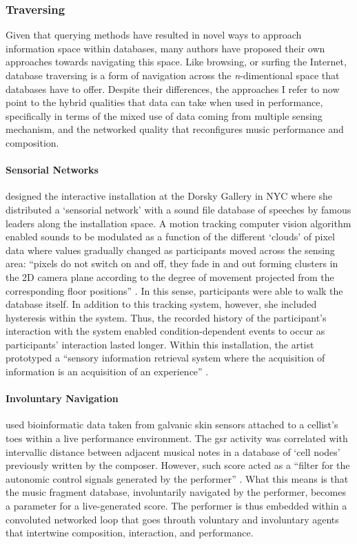 \subsubsection{Traversing}
{
	Given that querying methods have resulted in novel ways to approach information space within databases, many authors have proposed their own approaches towards navigating this space. Like browsing, or surfing the Internet, database traversing is a form of navigation across the \textit{n}-dimentional space that databases have to offer. Despite their differences, the approaches I refer to now point to the hybrid qualities that data can take when used in performance, specifically in terms of the mixed use of data coming from multiple sensing mechanism, and the networked quality that reconfigures music performance and composition.

	\paragraph{Sensorial Networks}
	\citeauthor{icmc/bbp2372.2000.146} \parencite{Cho00:Voi, icmc/bbp2372.2000.146} designed the interactive installation at the Dorsky Gallery in NYC where she distributed a `sensorial network' with a sound file database of speeches by famous leaders along the installation space. A motion tracking computer vision algorithm enabled sounds to be modulated as a function of the different `clouds' of pixel data where values gradually changed as participants moved across the sensing area: ``pixels do not switch on and off, they fade in and out forming clusters in the 2D camera plane according to the degree of movement projected from the corresponding floor positions'' \parencite{icmc/bbp2372.2000.146}. In this sense, participants were able to walk the database itself. In addition to this tracking system, however, she included hysteresis within the system. Thus, the recorded history of the participant's interaction with the system enabled condition-dependent events to occur as participants' interaction lasted longer. Within this installation, the artist prototyped a ``sensory information retrieval system where the acquisition of information is an acquisition of an experience'' \parencite{icmc/bbp2372.2000.146}.

	\paragraph{Involuntary Navigation}
	\citeauthor{icmc/bbp2372.2006.123} \parencite{icmc/bbp2372.2006.123} used bioinformatic data taken from galvanic skin sensors attached to a cellist's toes within a live performance environment. The \gls{gsr} activity was correlated with intervallic distance between adjacent musical notes in a database of `cell nodes' previously written by the composer. However, such score acted as a ``filter for the autonomic control signals generated by the performer'' \parencite[601]{icmc/bbp2372.2006.123}. What this means is that the music fragment database, involuntarily navigated by the performer, becomes a parameter for a live-generated score. The performer is thus embedded within a convoluted networked loop that goes throuth voluntary and involuntary agents that intertwine composition, interaction, and performance.

}
